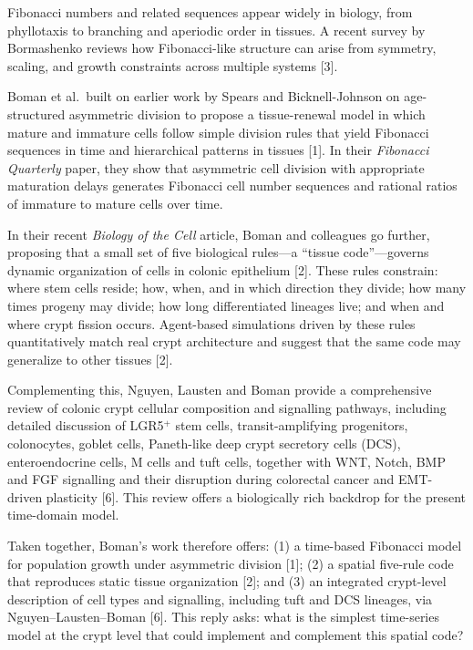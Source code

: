 \documentclass[]{interact}
\begin{document}
Fibonacci numbers and related sequences appear widely in biology, from
phyllotaxis to branching and aperiodic order in tissues.
A recent survey by Bormashenko reviews how Fibonacci-like structure can arise
from symmetry, scaling, and growth constraints across multiple systems [3].

Boman et al.\ built on earlier work by Spears and Bicknell-Johnson on
age-structured asymmetric division to propose a tissue-renewal model in which
mature and immature cells follow simple division rules that yield Fibonacci
sequences in time and hierarchical patterns in tissues [1].
In their \emph{Fibonacci Quarterly} paper, they show that asymmetric cell
division with appropriate maturation delays generates Fibonacci cell number
sequences and rational ratios of immature to mature cells over time.

In their recent \emph{Biology of the Cell} article, Boman and colleagues go
further, proposing that a small set of five biological rules---a ``tissue
code''---governs dynamic organization of cells in colonic epithelium [2].
These rules constrain: where stem cells reside; how, when, and in which
direction they divide; how many times progeny may divide; how long
differentiated lineages live; and when and where crypt fission occurs.
Agent-based simulations driven by these rules quantitatively match real crypt
architecture and suggest that the same code may generalize to other tissues [2].

Complementing this, Nguyen, Lausten and Boman provide a comprehensive review of
colonic crypt cellular composition and signalling pathways, including detailed
discussion of LGR5$^{+}$ stem cells, transit-amplifying progenitors,
colonocytes, goblet cells, Paneth-like deep crypt secretory cells (DCS),
enteroendocrine cells, M cells and tuft cells, together with WNT, Notch, BMP
and FGF signalling and their disruption during colorectal cancer and
EMT-driven plasticity [6].
This review offers a biologically rich backdrop for the present time-domain
model.

Taken together, Boman's work therefore offers: (1) a time-based Fibonacci model
for population growth under asymmetric division [1]; (2) a spatial five-rule
code that reproduces static tissue organization [2]; and (3) an integrated
crypt-level description of cell types and signalling, including tuft and DCS
lineages, via Nguyen--Lausten--Boman [6].
This reply asks: what is the simplest time-series model at the crypt level that
could implement and complement this spatial code?
\end{document}
